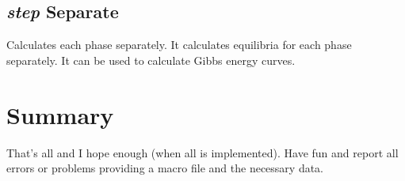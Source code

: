 \documentclass[12pt]{article}
\begin{document}
\subsection{{\em step} Separate}

Calculates each phase separately.  It calculates equilibria for each
phase separately.  It can be used to calculate Gibbs energy curves.


\section{Summary }

That's all and I hope enough (when all is implemented).  Have fun and
report all errors or problems providing a macro file and the necessary
data.
\end{document}
